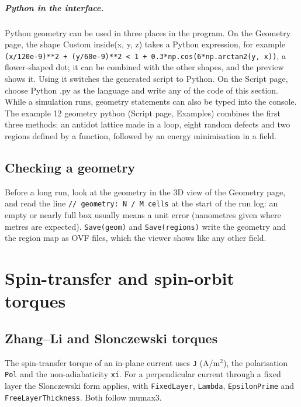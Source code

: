 \documentclass[11pt,a4paper,oneside]{book}
\newcommand{\code}[1]{\texttt{#1}}
\renewcommand{\_}{\textunderscore\allowbreak}
\newcommand{\menu}[1]{\textsf{#1}}
\begin{document}
\paragraph{Python in the interface.} Python geometry can be used in three places in the program. On the Geometry
page, the shape \menu{Custom inside(x, y, z)} takes a Python expression, for example
\code{(x/120e-9)**2 + (y/60e-9)**2 < 1 + 0.3*np.cos(6*np.arctan2(y, x))}, a flower-shaped dot; it can be combined
with the other shapes, and the preview shows it. Using it switches the generated script to Python. On the Script
page, choose \menu{Python .py} as the language and write any of the code of this section. While a simulation runs,
geometry statements can also be typed into the console. The example \menu{12 geometry python} (Script page,
\menu{Examples}) combines the first three methods: an antidot lattice made in a loop, eight random defects and two
regions defined by a function, followed by an energy minimisation in a field.

\section{Checking a geometry}

Before a long run, look at the geometry in the \menu{3D} view of the Geometry page, and read the line
\code{// geometry: N / M cells} at the start of the run log: an empty or nearly full box usually means a unit
error (nanometres given where metres are expected). \code{Save(geom)} and \code{Save(regions)} write the
geometry and the region map as OVF files, which the viewer shows like any other field.

\chapter{Spin-transfer and spin-orbit torques}\label{ch:torques}

\section{Zhang--Li and Slonczewski torques}

The spin-transfer torque of an in-plane current uses \code{J} (A/m$^2$), the polarisation \code{Pol} and the
non-adiabaticity \code{xi}. For a perpendicular current through a fixed layer the Slonczewski form applies, with
\code{FixedLayer}, \code{Lambda}, \code{EpsilonPrime} and \code{FreeLayerThickness}. Both follow mumax3.
\end{document}
